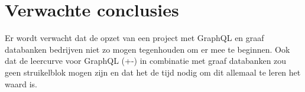 
\section{Verwachte conclusies}
\label{sec:verwachte_conclusies}
Er wordt verwacht dat de opzet van een project met GraphQL en graaf databanken bedrijven niet zo mogen tegenhouden om er mee te beginnen. Ook dat de leercurve voor GraphQL (+-) in combinatie met graaf databanken zou geen struikelblok mogen zijn en dat het de tijd nodig om dit allemaal te leren het waard is.


